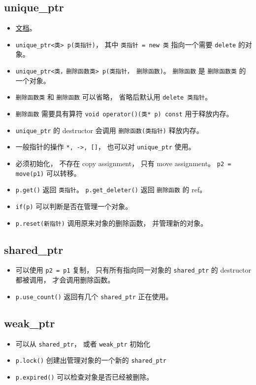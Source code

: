 
\begin{issues}
\issueDraft
\end{issues}

\subsection{unique\_ptr}
\begin{itemize}
\item \href{https://en.cppreference.com/w/cpp/memory/unique_ptr}{文档}。
\item \verb|unique_ptr<类> p(类指针)|， 其中 \verb|类指针 = new 类| 指向一个需要 \verb|delete| 的对象。
\item \verb|unique_ptr<类，删除函数类> p(类指针， 删除函数)|。 \verb|删除函数| 是 \verb|删除函数类| 的一个对象。
\item \verb|删除函数类| 和 \verb|删除函数| 可以省略， 省略后默认用 \verb|delete 类指针|。
\item \verb|删除函数| 需要具有算符 \verb|void operator()(类* p) const| 用于释放内存。
\item \verb|unique_ptr| 的 destructor 会调用 \verb|删除函数(类指针)| 释放内存。
\item 一般指针的操作 \verb|*, ->, []|， 也可以对 \verb|unique_ptr| 使用。
\item 必须初始化， 不存在 copy assignment， 只有 move assignment。 \verb|p2 = move(p1)| 可以转移。
\item \verb|p.get()| 返回 \verb|类指针|。 \verb|p.get_deleter()| 返回 \verb|删除函数| 的 ref。
\item \verb|if(p)| 可以判断是否在管理一个对象。
\item \verb|p.reset(新指针)| 调用原来对象的删除函数， 并管理新的对象。
\end{itemize}

\subsection{shared\_ptr}
\begin{itemize}
\item 可以使用 \verb|p2 = p1| 复制， 只有所有指向同一对象的 \verb|shared_ptr| 的 destructor 都被调用， 才会调用删除函数。
\item \verb|p.use_count()| 返回有几个 \verb|shared_ptr| 正在使用。
\end{itemize}

\subsection{weak\_ptr}
\begin{itemize}
\item 可以从 \verb|shared_ptr|， 或者 \verb|weak_ptr| 初始化
\item \verb|p.lock()| 创建出管理对象的一个新的 \verb|shared_ptr|
\item \verb|p.expired()| 可以检查对象是否已经被删除。
\end{itemize}
